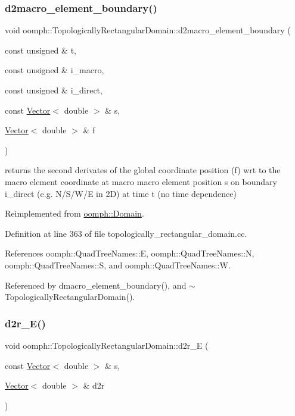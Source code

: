 \subsubsection{\texorpdfstring{d2macro\+\_\+element\+\_\+boundary()}{d2macro\_element\_boundary()}}
{\footnotesize\ttfamily void oomph\+::\+Topologically\+Rectangular\+Domain\+::d2macro\+\_\+element\+\_\+boundary (\begin{DoxyParamCaption}\item[{const unsigned \&}]{t,  }\item[{const unsigned \&}]{i\+\_\+macro,  }\item[{const unsigned \&}]{i\+\_\+direct,  }\item[{const \hyperlink{classoomph_1_1Vector}{Vector}$<$ double $>$ \&}]{s,  }\item[{\hyperlink{classoomph_1_1Vector}{Vector}$<$ double $>$ \&}]{f }\end{DoxyParamCaption})\hspace{0.3cm}{\ttfamily [virtual]}}

returns the second derivates of the global coordinate position (f) wrt to the macro element coordinate at macro macro element position s on boundary i\+\_\+direct (e.\+g. N/\+S/\+W/E in 2D) at time t (no time dependence) 

Reimplemented from \hyperlink{classoomph_1_1Domain_afeeb40f9179abe710f14effbe4db42a1}{oomph\+::\+Domain}.



Definition at line 363 of file topologically\+\_\+rectangular\+\_\+domain.\+cc.



References oomph\+::\+Quad\+Tree\+Names\+::E, oomph\+::\+Quad\+Tree\+Names\+::N, oomph\+::\+Quad\+Tree\+Names\+::S, and oomph\+::\+Quad\+Tree\+Names\+::W.



Referenced by dmacro\+\_\+element\+\_\+boundary(), and $\sim$\+Topologically\+Rectangular\+Domain().

\mbox{\label{classoomph_1_1TopologicallyRectangularDomain_ab40347c05811cfa8a76394204fd0611a}} 
\subsubsection{\texorpdfstring{d2r\+\_\+\+E()}{d2r\_E()}}
{\footnotesize\ttfamily void oomph\+::\+Topologically\+Rectangular\+Domain\+::d2r\+\_\+E (\begin{DoxyParamCaption}\item[{const \hyperlink{classoomph_1_1Vector}{Vector}$<$ double $>$ \&}]{s,  }\item[{\hyperlink{classoomph_1_1Vector}{Vector}$<$ double $>$ \&}]{d2r }\end{DoxyParamCaption})\hspace{0.3cm}{\ttfamily [private]}}



